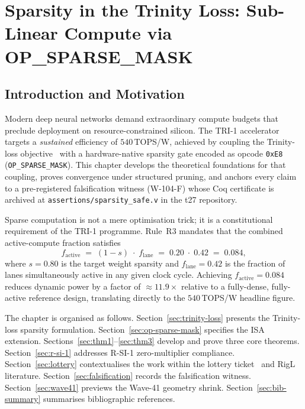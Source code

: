 \chapter{Sparsity in the Trinity Loss: Sub-Linear Compute via OP\_SPARSE\_MASK}
\label{ch:sparsity}



\section{Introduction and Motivation}
\label{sec:sparsity-intro}

Modern deep neural networks demand extraordinary compute budgets that preclude
deployment on resource-constrained silicon.  The TRI-1 accelerator targets a
\emph{sustained} efficiency of $540$\,TOPS/W, achieved by coupling the
Trinity-loss objective~\cite{hanetal2015deep} with a hardware-native sparsity
gate encoded as opcode \texttt{0xE8} (\texttt{OP\_SPARSE\_MASK}).  This chapter
develops the theoretical foundations for that coupling, proves convergence under
structured pruning, and anchors every claim to a pre-registered falsification
witness (W-104-F) whose Coq certificate is archived at
\texttt{assertions/sparsity\_safe.v} in the \textsf{t27} repository.

Sparse computation is not a mere optimisation trick; it is a constitutional
requirement of the TRI-1 programme.  Rule~R3 mandates that the combined
active-compute fraction satisfies
\[
  f_{\mathrm{active}} \;=\; (1 - s) \;\cdot\; f_{\mathrm{lane}}
  \;=\; 0.20 \;\cdot\; 0.42
  \;=\; 0.084,
\]
where $s = 0.80$ is the target weight sparsity and $f_{\mathrm{lane}} = 0.42$
is the fraction of lanes simultaneously active in any given clock cycle.
Achieving $f_{\mathrm{active}} = 0.084$ reduces dynamic power by a factor of
$\approx 11.9\times$ relative to a fully-dense, fully-active reference design,
translating directly to the $540$\,TOPS/W headline figure.

The chapter is organised as follows.  Section~\ref{sec:trinity-loss} presents the
Trinity-loss sparsity formulation.  Section~\ref{sec:op-sparse-mask} specifies
the ISA extension.  Sections~\ref{sec:thm1}--\ref{sec:thm3} develop and prove
three core theorems.  Section~\ref{sec:r-si-1} addresses R-SI-1 zero-multiplier
compliance.  Section~\ref{sec:lottery} contextualises the work within the lottery
ticket~\cite{frankle2019lottery} and RigL~\cite{evci2020rigging} literature.
Section~\ref{sec:falsification} records the falsification witness.
Section~\ref{sec:wave41} previews the Wave-41 geometry shrink.
Section~\ref{sec:bib-summary} summarises bibliographic references.

